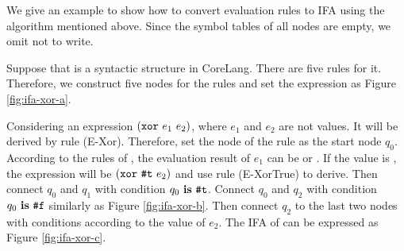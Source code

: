 \begin{example}

    We give an example to show how to convert evaluation rules to IFA using the algorithm mentioned above. Since the symbol tables of all nodes are empty, we omit not to write.


    Suppose that  is a syntactic structure in CoreLang. There are five rules for it. Therefore, we construct five nodes for the rules and set the expression as Figure \ref{fig:ifa-xor-a}.

    Considering an expression $(\mbox{\tt xor}~e_1~e_2)$, where $e_1$ and $e_2$ are not values. It will be derived by rule (E-Xor). Therefore, set the node of the rule as the start node $q_0$. According to the rules of , the evaluation result of $e_1$ can be  or . If the value is , the expression will be $(\mbox{\tt xor}~\mbox{\tt \#t}~e_2)$ and use rule (E-XorTrue) to derive. Then connect $q_0$ and $q_1$ with condition $q_0~\mbox{\rm \bf is}~\mbox{\tt \#t}$. Connect $q_0$ and $q_2$ with condition $q_0~\mbox{\rm \bf is}~\mbox{\tt \#f}$ similarly as Figure \ref{fig:ifa-xor-b}. Then connect $q_2$ to the last two nodes with conditions according to the value of $e_2$. The IFA of  can be expressed as Figure \ref{fig:ifa-xor-c}.
    \myend
\end{example}

